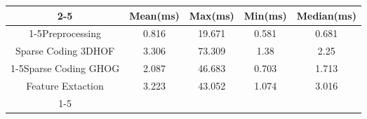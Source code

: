 \documentclass{standalone}
\begin{document}
 
 \begin{tabular}{|c |c |c |c |c |}
\cline{2-5}\cline{2-5} \multicolumn{1}{c |}{ } & Mean(ms) & Max(ms) & Min(ms) & Median(ms)\\ 
\cline{1-5}Preprocessing & 0.816 & 19.671 & 0.581 & 0.681\\ 
 \hhline{|=|=|=|=|=|}Sparse Coding 3DHOF & 3.306 & 73.309 & 1.38 & 2.25\\ 
 \cline{1-5}Sparse Coding GHOG & 2.087 & 46.683 & 0.703 & 1.713\\ 
 \hhline{|=|=|=|=|=|}Feature Extaction & 3.223 & 43.052 & 1.074 & 3.016\\ 
 \cline{1-5}\hline \end{tabular}
 
\end{document}
